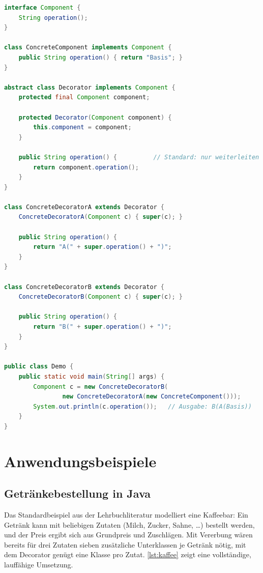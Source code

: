 \documentclass[a4paper,11pt,toc=listof,toc=bibliography]{scrartcl}
\begin{document}
\begin{lstlisting}[language=Java,caption={Abstrakte Implementierung des Decorator-Patterns in Java},label={lst:abstrakt}]
interface Component {
    String operation();
}

class ConcreteComponent implements Component {
    public String operation() { return "Basis"; }
}

abstract class Decorator implements Component {
    protected final Component component;

    protected Decorator(Component component) {
        this.component = component;
    }

    public String operation() {          // Standard: nur weiterleiten
        return component.operation();
    }
}

class ConcreteDecoratorA extends Decorator {
    ConcreteDecoratorA(Component c) { super(c); }

    public String operation() {
        return "A(" + super.operation() + ")";
    }
}

class ConcreteDecoratorB extends Decorator {
    ConcreteDecoratorB(Component c) { super(c); }

    public String operation() {
        return "B(" + super.operation() + ")";
    }
}

public class Demo {
    public static void main(String[] args) {
        Component c = new ConcreteDecoratorB(
                new ConcreteDecoratorA(new ConcreteComponent()));
        System.out.println(c.operation());   // Ausgabe: B(A(Basis))
    }
}
\end{lstlisting}

\section{Anwendungsbeispiele}
\label{sec:beispiele}

\subsection{Getränkebestellung in Java}
Das Standardbeispiel aus der Lehrbuchliteratur \cite{FR20} modelliert eine Kaffeebar: Ein Getränk kann mit beliebigen Zutaten (Milch, Zucker, Sahne, \dots) bestellt werden, und der Preis ergibt sich aus Grundpreis und Zuschlägen. Mit Vererbung wären bereits für drei Zutaten sieben zusätzliche Unterklassen je Getränk nötig, mit dem Decorator genügt eine Klasse pro Zutat. \autoref{lst:kaffee} zeigt eine vollständige, lauffähige Umsetzung.
\end{document}
